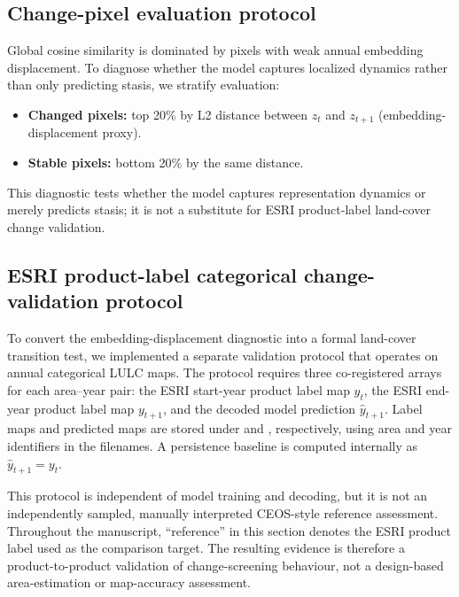 \documentclass{article}
\begin{document}
\subsection{Change-pixel evaluation protocol}

Global cosine similarity is dominated by pixels with weak annual embedding displacement. To diagnose whether the model captures localized dynamics rather than only predicting stasis, we stratify evaluation:
\begin{itemize}
\item \textbf{Changed pixels:} top 20\% by L2 distance between $z_t$ and $z_{t+1}$ (embedding-displacement proxy).
\item \textbf{Stable pixels:} bottom 20\% by the same distance.
\end{itemize}
This diagnostic tests whether the model captures representation dynamics or merely predicts stasis; it is not a substitute for ESRI product-label land-cover change validation.

\subsection{ESRI product-label categorical change-validation protocol}
\label{sec:independent_change_protocol}

To convert the embedding-displacement diagnostic into a formal land-cover transition test, we implemented a separate validation protocol that operates on annual categorical LULC maps. The protocol requires three co-registered arrays for each area--year pair: the ESRI start-year product label map $y_t$, the ESRI end-year product label map $y_{t+1}$, and the decoded model prediction $\hat{y}_{t+1}$. Label maps and predicted maps are stored under  and , respectively, using area and year identifiers in the filenames. A persistence baseline is computed internally as $\hat{y}_{t+1}=y_t$.

This protocol is independent of model training and decoding, but it is not an independently sampled, manually interpreted CEOS-style reference assessment. Throughout the manuscript, ``reference'' in this section denotes the ESRI product label used as the comparison target. The resulting evidence is therefore a product-to-product validation of change-screening behaviour, not a design-based area-estimation or map-accuracy assessment.
\end{document}
